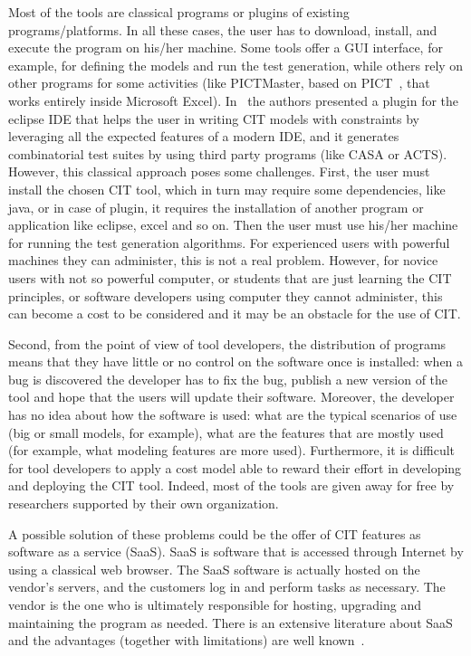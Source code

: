 \begin{tikzborder}{\cite{Gargantini16:validation}}
\begin{tikzborder}{\cite{gargantini_combinatorial_2017}}
\begin{tikzborder}{\cite{garn2019}}
\begin{tikzborder}{\cite{arcaini2019achieving}}
Most of the tools are classical programs or plugins of existing programs/platforms.  In all these cases, the user has to download, install, and execute the program on his/her machine.  Some tools offer a GUI interface, for example, for defining the models and run the test generation, while others rely on other programs for some activities (like PICTMaster, based on PICT~\cite{czerwonka2006pairwise}, that works entirely inside Microsoft Excel). %
In~\cite{citlab12} the authors presented a plugin for the eclipse IDE that helps the user in writing CIT models with constraints by leveraging all the expected features of a modern IDE, and it generates combinatorial test suites by using third party programs (like CASA or ACTS).
However, this classical approach poses some challenges. First, the user must install the chosen CIT tool, which in turn may require some dependencies, like java, or in case of plugin, it requires the installation of another program or application like eclipse, excel and so on. Then the user must use his/her machine for running the test generation algorithms. For experienced users with powerful machines they can administer, this is not a real problem. However, for novice users with not so powerful computer, or students that are just learning the CIT principles, or software developers using computer they cannot administer, this can become a cost to be considered and it may be an obstacle for the use of CIT.

Second, from the point of view of tool developers, the distribution of programs means that they have little or no control on the software once is installed: when a bug is discovered the developer has to fix the bug, publish a new version of the tool and hope that the users will update their software. Moreover, the developer has no idea about how the software is used: what are the typical scenarios of use (big or small models, for example), what are the features that are mostly used (for example, what modeling features are more used). Furthermore, it is difficult for tool developers to apply a cost model able to reward their effort in developing and deploying the CIT tool. Indeed, most of the tools are given away for free by researchers supported by their own organization.

A possible solution of these problems could be the offer of CIT features as software as a service (SaaS). SaaS is software that is accessed through Internet by using a classical web browser.  The SaaS software is actually hosted on the vendor’s servers, and the customers log in and perform tasks as necessary.  The 
vendor is the one who is ultimately responsible for hosting, upgrading and maintaining the program as needed.  There is an extensive literature about SaaS and the advantages (together with limitations) are well known~\cite{Menken:2008}. 


\end{tikzborder}
\end{tikzborder}
\end{tikzborder}
\end{tikzborder}
